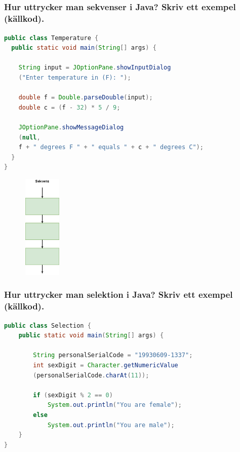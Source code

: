 \documentclass[../main.tex]{subfiles}
\begin{document}
\subsection{}
\subsubsection{Hur uttrycker man sekvenser i Java? Skriv ett exempel (källkod).}
\begin{lstlisting}[language=java]
public class Temperature {
  public static void main(String[] args) {
  
    String input = JOptionPane.showInputDialog
    ("Enter temperature in (F): ");
    
    double f = Double.parseDouble(input);
    double c = (f - 32) * 5 / 9;
    
    JOptionPane.showMessageDialog
    (null,
    f + " degrees F " + " equals " + c + " degrees C");
  }
}
\end{lstlisting}

\includegraphics[width=4cm, height=5cm]{sec1/Figs/sekvens.jpg}

\newpage

\subsubsection{Hur uttrycker man selektion i Java? Skriv ett exempel (källkod).}
\begin{lstlisting}[language=java]
public class Selection {
    public static void main(String[] args) {

        String personalSerialCode = "19930609-1337";
        int sexDigit = Character.getNumericValue
        (personalSerialCode.charAt(11));

        if (sexDigit % 2 == 0)
            System.out.println("You are female");
        else
            System.out.println("You are male");
    }
}
\end{lstlisting}
\end{document}
